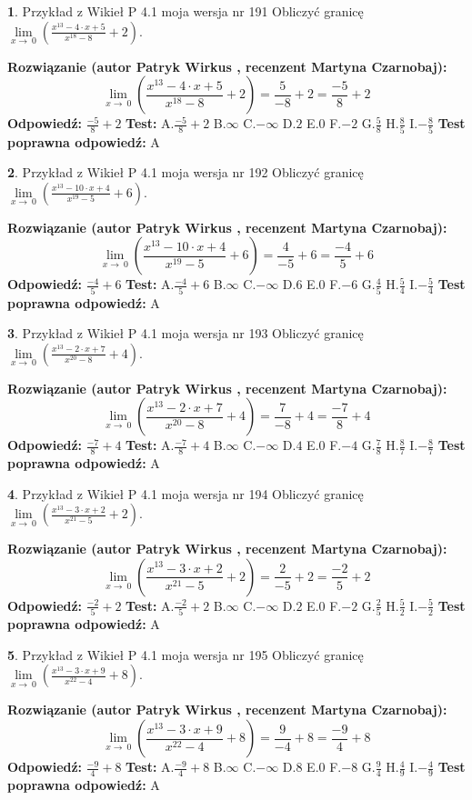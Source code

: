 \documentclass[12pt, a4paper]{article}
\theoremstyle{definition} %
\newtheorem{zad}{}
\newcommand{\zadStart}[1]{\begin{zad}#1\newline}
\newcommand{\zadStop}{\end{zad}}
\newcommand{\rozwStart}[2]{\noindent \textbf{Rozwiązanie (autor #1 , recenzent #2): }\newline}
\newcommand{\rozwStop}{\newline}
\newcommand{\odpStart}{\noindent \textbf{Odpowiedź:}\newline}
\newcommand{\odpStop}{\newline}
\newcommand{\testStart}{\noindent \textbf{Test:}\newline}
\newcommand{\testStop}{\newline}
\newcommand{\kluczStart}{\noindent \textbf{Test poprawna odpowiedź:}\newline}
\newcommand{\kluczStop}{\newline}
\begin{document}
\zadStart{Przykład z Wikieł P 4.1 moja wersja nr 191}
Obliczyć granicę $\lim\limits_{x\to\ 0}(\frac{x^{13}-4 \cdot x +5}{x^{18}-8}+2)$.
\zadStop
\rozwStart{Patryk Wirkus}{Martyna Czarnobaj}
$$\lim\limits_{x\to\ 0}(\frac{x^{13}-4 \cdot x +5}{x^{18}-8}+2)=\frac{5}{-8}+2=\frac{-5}{8}+2$$
\rozwStop
\odpStart
$\frac{-5}{8}+2$
\odpStop
\testStart
A.$\frac{-5}{8}+2$
B.$\infty$
C.$-\infty$
D.$2$
E.$0$
F.$-2$
G.$\frac{5}{8}$
H.$\frac{8}{5}$
I.$-\frac{8}{5}$
\testStop
\kluczStart
A
\kluczStop



\zadStart{Przykład z Wikieł P 4.1 moja wersja nr 192}
Obliczyć granicę $\lim\limits_{x\to\ 0}(\frac{x^{13}-10 \cdot x +4}{x^{19}-5}+6)$.
\zadStop
\rozwStart{Patryk Wirkus}{Martyna Czarnobaj}
$$\lim\limits_{x\to\ 0}(\frac{x^{13}-10 \cdot x +4}{x^{19}-5}+6)=\frac{4}{-5}+6=\frac{-4}{5}+6$$
\rozwStop
\odpStart
$\frac{-4}{5}+6$
\odpStop
\testStart
A.$\frac{-4}{5}+6$
B.$\infty$
C.$-\infty$
D.$6$
E.$0$
F.$-6$
G.$\frac{4}{5}$
H.$\frac{5}{4}$
I.$-\frac{5}{4}$
\testStop
\kluczStart
A
\kluczStop



\zadStart{Przykład z Wikieł P 4.1 moja wersja nr 193}
Obliczyć granicę $\lim\limits_{x\to\ 0}(\frac{x^{13}-2 \cdot x +7}{x^{20}-8}+4)$.
\zadStop
\rozwStart{Patryk Wirkus}{Martyna Czarnobaj}
$$\lim\limits_{x\to\ 0}(\frac{x^{13}-2 \cdot x +7}{x^{20}-8}+4)=\frac{7}{-8}+4=\frac{-7}{8}+4$$
\rozwStop
\odpStart
$\frac{-7}{8}+4$
\odpStop
\testStart
A.$\frac{-7}{8}+4$
B.$\infty$
C.$-\infty$
D.$4$
E.$0$
F.$-4$
G.$\frac{7}{8}$
H.$\frac{8}{7}$
I.$-\frac{8}{7}$
\testStop
\kluczStart
A
\kluczStop



\zadStart{Przykład z Wikieł P 4.1 moja wersja nr 194}
Obliczyć granicę $\lim\limits_{x\to\ 0}(\frac{x^{13}-3 \cdot x +2}{x^{21}-5}+2)$.
\zadStop
\rozwStart{Patryk Wirkus}{Martyna Czarnobaj}
$$\lim\limits_{x\to\ 0}(\frac{x^{13}-3 \cdot x +2}{x^{21}-5}+2)=\frac{2}{-5}+2=\frac{-2}{5}+2$$
\rozwStop
\odpStart
$\frac{-2}{5}+2$
\odpStop
\testStart
A.$\frac{-2}{5}+2$
B.$\infty$
C.$-\infty$
D.$2$
E.$0$
F.$-2$
G.$\frac{2}{5}$
H.$\frac{5}{2}$
I.$-\frac{5}{2}$
\testStop
\kluczStart
A
\kluczStop



\zadStart{Przykład z Wikieł P 4.1 moja wersja nr 195}
Obliczyć granicę $\lim\limits_{x\to\ 0}(\frac{x^{13}-3 \cdot x +9}{x^{22}-4}+8)$.
\zadStop
\rozwStart{Patryk Wirkus}{Martyna Czarnobaj}
$$\lim\limits_{x\to\ 0}(\frac{x^{13}-3 \cdot x +9}{x^{22}-4}+8)=\frac{9}{-4}+8=\frac{-9}{4}+8$$
\rozwStop
\odpStart
$\frac{-9}{4}+8$
\odpStop
\testStart
A.$\frac{-9}{4}+8$
B.$\infty$
C.$-\infty$
D.$8$
E.$0$
F.$-8$
G.$\frac{9}{4}$
H.$\frac{4}{9}$
I.$-\frac{4}{9}$
\testStop
\kluczStart
A
\kluczStop
\end{document}
